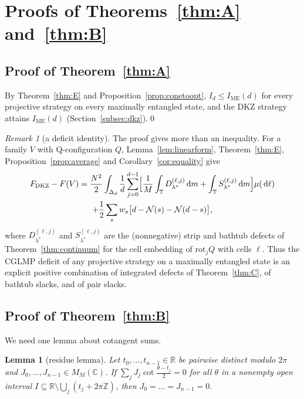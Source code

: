\documentclass[11pt]{amsart}
\newtheorem{lemma}[theorem]{Lemma}
\theoremstyle{definition}
\theoremstyle{remark}
\newtheorem{remark}[theorem]{Remark}
\numberwithin{equation}{section}
\newcommand{\Z}{\mathbb{Z}}
\newcommand{\R}{\mathbb{R}}
\newcommand{\C}{\mathbb{C}}
\newcommand{\T}{\mathbb{T}}
\newcommand{\FD}{F_{\mathrm{DKZ}}}
\newcommand{\IME}{I_{\mathrm{ME}}}
\newcommand{\cN}{\mathcal{N}}
\newcommand{\dd}{\,\mathrm{d}}
\begin{document}
\section{Proofs of Theorems~\ref{thm:A} and~\ref{thm:B}}\label{sec:proofsAB}

\subsection{Proof of Theorem~\ref{thm:A}}
By Theorem~\ref{thm:E} and Proposition~\ref{prop:conetoopt}, $I_d\le\IME(d)$ for every projective strategy on every
maximally entangled state, and the DKZ strategy attains $\IME(d)$ (Section~\ref{subsec:dkz}).\qed

\begin{remark}[a deficit identity]\label{rem:deficit}
The proof gives more than an inequality. For a family $V$ with Q-configuration $Q$, Lemma~\ref{lem:linearform},
Theorem~\ref{thm:E}, Proposition~\ref{prop:average} and Corollary~\ref{cor:equality} give
\begin{multline*}
\FD-F(V)=\frac{N^2}{2}\int_{\Delta_d}\frac1d\sum_{j=0}^{d-1}\Bigl[\frac1M\int_\T D^{(\ell,j)}_{\lambda^*}\dd m
+\int_\T S^{(\ell,j)}_{\lambda^*}\dd m\Bigr]\mu(\dd\ell)\\
+\frac12\sum_sw_s\bigl[d-\cN(s)-\cN(d-s)\bigr],
\end{multline*}
where $D^{(\ell,j)}_{\lambda^*}$ and $S^{(\ell,j)}_{\lambda^*}$ are the (nonnegative) strip and bathtub defects of
Theorem~\ref{thm:continuum} for the cell embedding of $\mathrm{rot}_jQ$ with cells $\ell$. Thus the CGLMP deficit of any
projective strategy on a maximally entangled state is an explicit positive combination of integrated defects of
Theorem~\ref{thm:C}, of bathtub slacks, and of pair slacks.
\end{remark}

\subsection{Proof of Theorem~\ref{thm:B}}
We need one lemma about cotangent sums.

\begin{lemma}[residue lemma]\label{lem:residue}
Let $t_0,\dots,t_{n-1}\in\R$ be pairwise distinct modulo $2\pi$ and $J_0,\dots,J_{n-1}\in M_M(\C)$. If
$\sum_jJ_j\cot\frac{\theta-t_j}2=0$ for all $\theta$ in a nonempty open interval $I\subseteq\R\setminus\bigcup_j(t_j+2\pi\Z)$, then
$J_0=\dots=J_{n-1}=0$.
\end{lemma}
\end{document}
